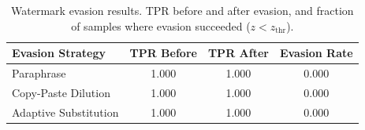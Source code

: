 \begin{table}[t]
\centering
\small
\caption{Watermark evasion results. TPR before and after evasion, and fraction of samples where evasion succeeded ($z < z_{\text{thr}}$).}
\label{tab:evasion}
\begin{tabular}{lccc}
\toprule
Evasion Strategy & TPR Before & TPR After & Evasion Rate \\
\midrule
Paraphrase & 1.000 & 1.000 & 0.000 \\
Copy-Paste Dilution & 1.000 & 1.000 & 0.000 \\
Adaptive Substitution & 1.000 & 1.000 & 0.000 \\
\bottomrule
\end{tabular}
\end{table}
